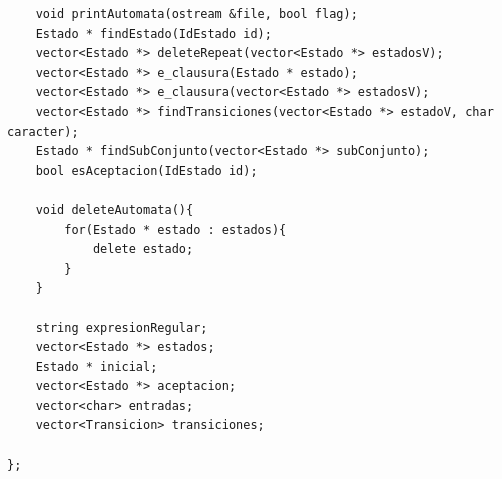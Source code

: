 \documentclass[a4paper,12pt]{article}
\begin{document}
\begin{enumerate}
\begin{lstlisting}
    void printAutomata(ostream &file, bool flag);
    Estado * findEstado(IdEstado id);
    vector<Estado *> deleteRepeat(vector<Estado *> estadosV);
    vector<Estado *> e_clausura(Estado * estado);
    vector<Estado *> e_clausura(vector<Estado *> estadosV);
    vector<Estado *> findTransiciones(vector<Estado *> estadoV, char caracter);
    Estado * findSubConjunto(vector<Estado *> subConjunto);
    bool esAceptacion(IdEstado id);

    void deleteAutomata(){
        for(Estado * estado : estados){
            delete estado;
        }
    }

    string expresionRegular;
    vector<Estado *> estados;
    Estado * inicial;
    vector<Estado *> aceptacion;
    vector<char> entradas;
    vector<Transicion> transiciones;

};


\end{lstlisting}
\end{enumerate}
\end{document}
